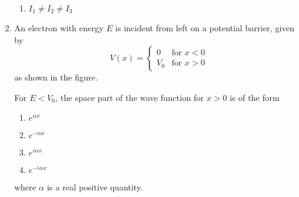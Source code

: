 \documentclass[journal]{IEEEtran}
\begin{document}
\begin{enumerate}
\begin{enumerate}
    \item $I_1 \neq I_2 \neq I_3$
\end{enumerate}
\item An electron with energy $E$ is incident from left on a potential barrier, given by
\[V(x) = \begin{cases} 
    0 & \text{for } x < 0 \\
    V_0 & \text{for } x > 0
\end{cases}\]
as shown in the figure.
\begin{figure}[H]
\centering
{}
\label{fig:my_label}
\end{figure}
For $E < V_0$, the space part of the wave function for $x > 0$ is of the form
\begin{enumerate}
    \item $e^{\alpha x}$
    \item $e^{-\alpha x}$
    \item $e^{i\alpha x}$
    \item $e^{-i\alpha x}$
\end{enumerate}
where $\alpha$ is a real positive quantity.
\end{enumerate}
\end{document}
